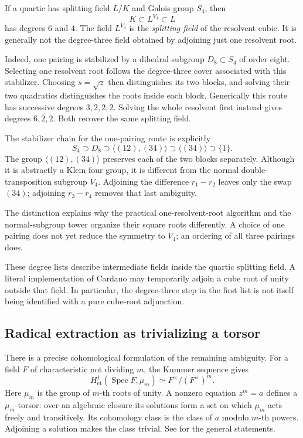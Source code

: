 \documentclass[11pt]{article}
\theoremstyle{remark}
\newcommand{\Spec}{\operatorname{Spec}}
\newcommand{\et}{\mathrm{\acute et}}
\begin{document}
If a quartic has splitting field \(L/K\) and Galois group \(S_4\), then
\[
K\subset L^{V_4}\subset L
\]
has degrees \(6\) and \(4\). The field \(L^{V_4}\) is the \emph{splitting field} of the resolvent cubic. It is generally not the degree-three field obtained by adjoining just one resolvent root.

Indeed, one pairing is stabilized by a dihedral subgroup \(D_8\subset S_4\) of order eight. Selecting one resolvent root follows the degree-three cover associated with this stabilizer. Choosing \(s=\sqrt z\) then distinguishes its two blocks, and solving their two quadratics distinguishes the roots inside each block. Generically this route has successive degrees \(3,2,2,2\). Solving the whole resolvent first instead gives degrees \(6,2,2\). Both recover the same splitting field.

The stabilizer chain for the one-pairing route is explicitly
\[
S_4\supset D_8\supset\langle(12),(34)\rangle
\supset\langle(34)\rangle\supset\{1\}.
\]
The group \(\langle(12),(34)\rangle\) preserves each of the two blocks separately. Although it is abstractly a Klein four group, it is different from the normal double-transposition subgroup \(V_4\). Adjoining the difference \(r_1-r_2\) leaves only the swap \((34)\); adjoining \(r_3-r_4\) removes that last ambiguity.

The distinction explains why the practical one-resolvent-root algorithm and the normal-subgroup tower organize their square roots differently. A choice of one pairing does not yet reduce the symmetry to \(V_4\); an ordering of all three pairings does.

These degree lists describe intermediate fields inside the quartic splitting field. A literal implementation of Cardano may temporarily adjoin a cube root of unity outside that field. In particular, the degree-three step in the first list is not itself being identified with a pure cube-root adjunction.

\subsection{Radical extraction as trivializing a torsor}

There is a precise cohomological formulation of the remaining ambiguity. For a field \(F\) of characteristic not dividing \(m\), the Kummer sequence gives
\begin{equation}
H^1_{\et}(\Spec F,\mu_m)\simeq F^\times/(F^\times)^m.
\label{eq:kummer}
\end{equation}
Here \(\mu_m\) is the group of \(m\)-th roots of unity. A nonzero equation \(z^m=a\) defines a \(\mu_m\)-torsor: over an algebraic closure its solutions form a set on which \(\mu_m\) acts freely and transitively. Its cohomology class is the class of \(a\) modulo \(m\)-th powers. Adjoining a solution makes the class trivial. See \cite{stacks-kummer,stacks-torsors} for the general statements.
\end{document}
